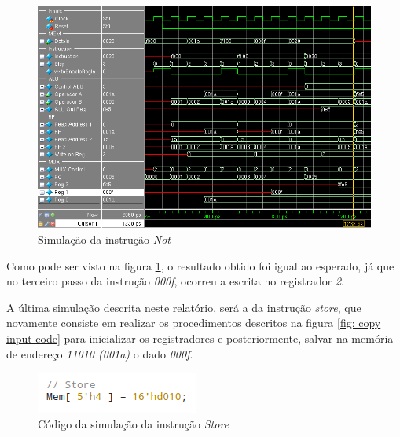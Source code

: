 \documentclass[12pt, a4paper]{article}
\begin{document}
    \vspace{\baselineskip}

    \begin{figure}[!h]
        \centering
        \includegraphics[width=15cm]{./NOT/not}
        \caption{Simulação da instrução \textit{Not}}
        \label{fig: not}
    \end{figure}

    \par Como pode ser visto na figura \ref{fig: not}, o resultado obtido foi igual ao esperado, já que no terceiro passo da instrução \textit{000f}, ocorreu a escrita no registrador \textit{2}.
    
    \vspace{\baselineskip}
    
    \par A última simulação descrita neste relatório, será a da instrução \textit{store}, que novamente consiste em realizar os procedimentos descritos na figura \ref{fig: copy input code} para inicializar os registradores e posteriormente, salvar na memória de endereço \textit{11010 (001a)} o dado \textit{000f}.
    
    \begin{figure}[!h]
    	\centering
    	\includegraphics{./STORE/store_code}
    	\caption{Código da simulação da instrução \textit{Store}}
    	\label{fig: store code}
    \end{figure}
    
    \vspace{\baselineskip}
    
\end{document}

